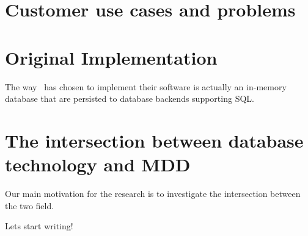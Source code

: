 \section{Customer use cases and problems}
\label{sec:Customer use cases and problems}

\section{Original Implementation}
\label{sec:Original Implementation}

The way \genus~has chosen to implement their software is actually an in-memory database that are persisted to database backends supporting SQL. 


\section{The intersection between database technology and MDD}
\label{sec:The intersection between database technology and MDD}
Our main motivation for the research is to investigate the intersection between the two field. 

Lets start writing!
